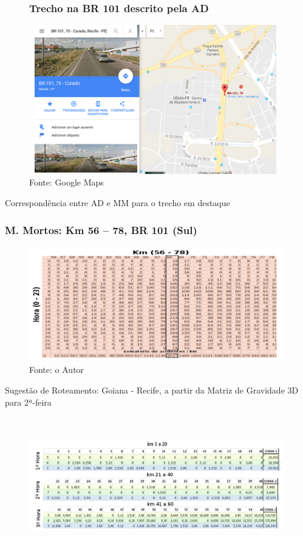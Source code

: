 \documentclass[11pt]{beamer}
\begin{document}
\begin{frame}
	\begin{figure}[htbp!]
		\frametitle{Trecho na BR 101 descrito pela AD}
		\centering
		\label{fig:Km70BR101}
		\includegraphics[width=110mm, height=65mm]{Figuras/Resultados/Km70BR101}\\
		\tiny Fonte: Google Maps
	\end{figure}
\end{frame}

\begin{frame}
	Correspondência entre AD e MM para o trecho em destaque
	\frametitle{M. Mortos: Km 56 -- 78, BR 101 (Sul)}
	\begin{figure}[htbp!]
		\centering
		\label{fig:MatrizMortos2d-101}
		\includegraphics[width=110mm, height=50mm]{Figuras/Resultados/MM2d101}\\
		\tiny Fonte: o Autor
	\end{figure}
\end{frame}

\begin{frame}
	Sugestão de Roteamento: Goiana - Recife, a partir da Matriz de Gravidade 3D para 2ª-feira
	\begin{figure}[ht]
		\centering
		\includegraphics[width=110mm, height=60mm]{Figuras/Metodologia/RotaExemplo.png}\\
	\end{figure}
\end{frame}
\end{document}
